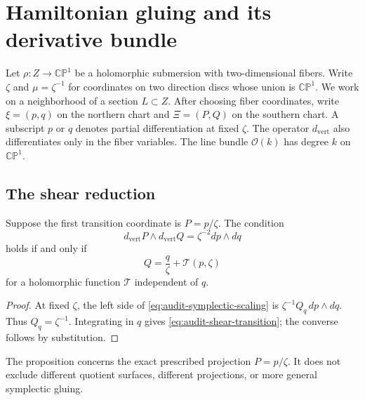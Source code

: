 
\section{Hamiltonian gluing and its derivative bundle}

Let $\rho:Z\to\mathbb{CP}^1$ be a holomorphic submersion with
two-dimensional fibers. Write $\zeta$ and $\mu=\zeta^{-1}$ for coordinates
on two direction discs whose union is $\mathbb{CP}^1$. We work on a
neighborhood of a section $L\subset Z$. After choosing fiber coordinates,
write $\xi=(p,q)$ on the northern chart and $\Xi=(P,Q)$ on the southern
chart. A subscript $p$ or $q$ denotes partial differentiation at fixed
$\zeta$. The operator $d_{\mathrm{vert}}$ also differentiates only in
the fiber variables. The line bundle $\mathcal O(k)$ has degree $k$ on
$\mathbb{CP}^1$.

\subsection{The shear reduction}

\begin{proposition}
Suppose the first transition coordinate is $P=p/\zeta$. The condition
\begin{equation}\label{eq:audit-symplectic-scaling}
d_{\mathrm{vert}}P\wedge d_{\mathrm{vert}}Q
=\zeta^{-2}dp\wedge dq
\end{equation}
holds if and only if
\begin{equation}\label{eq:audit-shear-transition}
Q=\frac q\zeta+\mathcal T(p,\zeta)
\end{equation}
for a holomorphic function $\mathcal T$ independent of $q$.
\end{proposition}
\begin{proof}
At fixed $\zeta$, the left side of
\eqref{eq:audit-symplectic-scaling} is
$\zeta^{-1}Q_q\,dp\wedge dq$. Thus $Q_q=\zeta^{-1}$.
Integrating in $q$ gives \eqref{eq:audit-shear-transition}; the converse
follows by substitution.
\end{proof}

The proposition concerns the exact prescribed projection $P=p/\zeta$.
It does not exclude different quotient surfaces, different projections,
or more general symplectic gluing.

